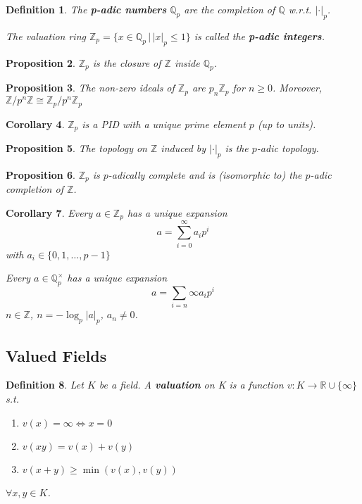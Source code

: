 \documentclass[a4paper]{article}
\newtheorem{definition}{Definition}
\newtheorem{prop}[definition]{Proposition}
\newtheorem{corollary}[definition]{Corollary}
\newcommand*\abs[1]{\left|#1\right|}
\begin{document}
\begin{definition}
	The \textbf{p-adic numbers} $\mathbb{Q}_p$ are the completion of $\mathbb{Q}$ w.r.t. $\abs{\cdot}_p$.
	
	The valuation ring $\mathbb{Z}_p = \{x \in \mathbb{Q}_p \,|\, \abs{x}_p \leq 1 \}$ is called the \textbf{p-adic integers}.
\end{definition}

\begin{prop}
	$\mathbb{Z}_p$ is the closure of $\mathbb{Z}$ inside $\mathbb{Q}_p$.
\end{prop}

\begin{prop}
	The non-zero ideals of $\mathbb{Z}_p$ are $p_n\mathbb{Z}_p$ for $n \geq 0$.
	Moreover, $\mathbb{Z}/p^n\mathbb{Z} \cong \mathbb{Z}_p/p^n\mathbb{Z}_p$
\end{prop}

\begin{corollary}
	$\mathbb{Z}_p$ is a PID with a unique prime element $p$ (up to units).
\end{corollary}

\begin{prop}
	The topology on $\mathbb{Z}$ induced by $\abs{\cdot}_p$ is the $p$-adic topology.
\end{prop}

\begin{prop}
	$\mathbb{Z}_p$ is $p$-adically complete and is (isomorphic to) the $p$-adic completion of $\mathbb{Z}$.
\end{prop}

\begin{corollary}
	Every $a \in \mathbb{Z}_p$ has a unique expansion $$a = \sum_{i=0}^\infty a_ip^i$$ with $a_i \in \{0, 1, \dots, p-1\}$
	
	Every $a \in \mathbb{Q}_p^\times$ has a unique expansion $$a = \sum_{i=n}{\infty}a_ip^i$$ $n \in \mathbb{Z}$, $n = -\log_p\abs{a}_p$, $a_n \neq 0$.
\end{corollary}

\subsection{Valued Fields}
\begin{definition}
	Let $K$ be a field. A \textbf{valuation} on K is a function $v : K \to \mathbb{R} \cup \{\infty\}$ s.t.
	\begin{enumerate}[label=\roman*.]
		\item $v(x) = \infty \iff x = 0$
		\item $v(xy) = v(x)+v(y)$
		\item $v(x+y) \geq \min(v(x), v(y))$
	\end{enumerate}
	$\forall x, y \in K$.
\end{definition}
\end{document}
